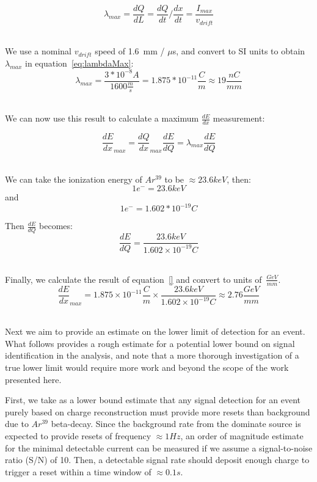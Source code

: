 \begin{equation}
\lambda_{max} = \frac{dQ}{dL} = \frac{dQ}{dt} / \frac{dx}{dt} = \frac{I_{max}}{v_{drift}}
\end{equation}
~\label{eq:lambdaMax}

We use a nominal $v_{drift}$ speed of 1.6~\unit{mm} / $\mu$s, and convert to SI units to obtain $\lambda_{max}$ in equation~\ref{eq:lambdaMax}:
\begin{equation}
\lambda_{max} = \frac{3*10^{-8} A}{1600 \frac{m}{s}} = 1.875*10^{-11} \frac{C}{m} \approx 19 \frac{nC}{mm}
\end{equation}
~\label{eq:lambdaCalc}

We can now use this result to calculate a maximum $\frac{dE}{dx}$ measurement:

\begin{equation}
\frac{dE}{dx}_{max} = \frac{dQ}{dx}_{max}\frac{dE}{dQ} = \lambda_{max}\frac{dE}{dQ}
\end{equation}
~\label{eq:dedxMax}

We can take the ionization energy of $Ar^{39}$ to be $\approx 23.6 keV$, then:
$$
1 e^{-} = 23.6 keV
$$
and
$$
1 e^{-} = 1.602*10^{-19} C
$$

Then $\frac{dE}{dQ}$ becomes:
\begin{equation}
\frac{dE}{dQ} = \frac{23.6 keV}{1.602\times 10^{-19} C}
\end{equation}
~\label{eq:dedxValue}

Finally, we calculate the result of equation~\ref{} and convert to units of~$\frac{GeV}{mm}$.
\begin{equation}
\frac{dE}{dx}_{max} = 1.875\times 10^{-11} \frac{C}{m} \times  \frac{23.6 keV}{1.602\times 10^{-19} C} \approx 2.76 \frac{GeV}{mm}
\end{equation}
~\label{eq:dedxCalc}

Next we aim to provide an estimate on the lower limit of detection for an event.
What follows provides a rough estimate for a potential lower bound on signal identification in the analysis, and note that a more thorough investigation of a true lower limit would require more work and beyond the scope of the work presented here.

First, we take as a lower bound estimate that any signal detection for an event purely based on charge reconstruction must provide more resets than background due to $Ar^{39}$ beta-decay.
Since the background rate from the dominate source is expected to provide resets of frequency $\approx 1\unit{Hz}$, an order of magnitude estimate for the minimal detectable current can be measured if we assume a signal-to-noise ratio (S/N) of 10.
Then, a detectable signal rate should deposit enough charge to trigger a reset within a time window of $\approx 0.1 \unit{s}$.

